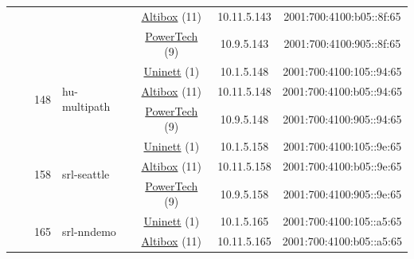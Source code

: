 \begin{small}
\begin{center}
\begin{longtable}{|c|c|c|c|c|c|c|c|}
  &  &  &  & \multicolumn{2}{|c|}{\tiny{\href{https://www.altibox.no}{Altibox} (11)}} & \tiny{10.11.5.143} & \tiny{2001:700:4100:b05::8f:65} \\* \cline{5-5}\cline{6-6}\cline{7-7}\cline{8-8}
  &  &  &  & \multicolumn{2}{|c|}{\tiny{\href{http://www.powertech.no}{PowerTech} (9)}} & \tiny{10.9.5.143} & \tiny{2001:700:4100:905::8f:65} \\* \cline{3-3}\cline{4-4}\cline{5-5}\cline{6-6}\cline{7-7}\cline{8-8}
  &  & \multirow{3}{*}{\tiny{148}} & \multicolumn{1}{|l|}{\multirow{3}{*}{\tiny{hu-multipath}}} & \multicolumn{2}{|c|}{\tiny{\href{https://www.uninett.no}{Uninett} (1)}} & \tiny{10.1.5.148} & \tiny{2001:700:4100:105::94:65} \\* \cline{5-5}\cline{6-6}\cline{7-7}\cline{8-8}
  &  &  &  & \multicolumn{2}{|c|}{\tiny{\href{https://www.altibox.no}{Altibox} (11)}} & \tiny{10.11.5.148} & \tiny{2001:700:4100:b05::94:65} \\* \cline{5-5}\cline{6-6}\cline{7-7}\cline{8-8}
  &  &  &  & \multicolumn{2}{|c|}{\tiny{\href{http://www.powertech.no}{PowerTech} (9)}} & \tiny{10.9.5.148} & \tiny{2001:700:4100:905::94:65} \\* \cline{3-3}\cline{4-4}\cline{5-5}\cline{6-6}\cline{7-7}\cline{8-8}
  &  & \multirow{3}{*}{\tiny{158}} & \multicolumn{1}{|l|}{\multirow{3}{*}{\tiny{srl-seattle}}} & \multicolumn{2}{|c|}{\tiny{\href{https://www.uninett.no}{Uninett} (1)}} & \tiny{10.1.5.158} & \tiny{2001:700:4100:105::9e:65} \\* \cline{5-5}\cline{6-6}\cline{7-7}\cline{8-8}
  &  &  &  & \multicolumn{2}{|c|}{\tiny{\href{https://www.altibox.no}{Altibox} (11)}} & \tiny{10.11.5.158} & \tiny{2001:700:4100:b05::9e:65} \\* \cline{5-5}\cline{6-6}\cline{7-7}\cline{8-8}
  &  &  &  & \multicolumn{2}{|c|}{\tiny{\href{http://www.powertech.no}{PowerTech} (9)}} & \tiny{10.9.5.158} & \tiny{2001:700:4100:905::9e:65} \\* \cline{3-3}\cline{4-4}\cline{5-5}\cline{6-6}\cline{7-7}\cline{8-8}
  &  & \multirow{3}{*}{\tiny{165}} & \multicolumn{1}{|l|}{\multirow{3}{*}{\tiny{srl-nndemo}}} & \multicolumn{2}{|c|}{\tiny{\href{https://www.uninett.no}{Uninett} (1)}} & \tiny{10.1.5.165} & \tiny{2001:700:4100:105::a5:65} \\* \cline{5-5}\cline{6-6}\cline{7-7}\cline{8-8}
  &  &  &  & \multicolumn{2}{|c|}{\tiny{\href{https://www.altibox.no}{Altibox} (11)}} & \tiny{10.11.5.165} & \tiny{2001:700:4100:b05::a5:65} \\* \cline{5-5}\cline{6-6}\cline{7-7}\cline{8-8}

\end{longtable}
\end{center}
\end{small}
